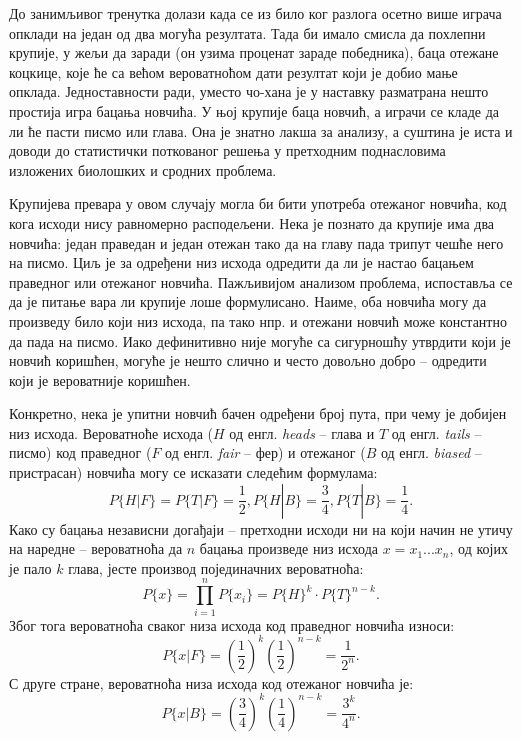 \documentclass[12pt,oneside]{memoir}
\begin{document}
\begin{CJK}{UTF8}{ipxm}
До занимљивог тренутка долази када се из било ког разлога осетно више играча опклади на један од два могућа резултата. Тада би имало смисла да похлепни крупије, у жељи да заради (он узима проценат зараде победника), баца отежане коцкице, које ће са већом вероватноћом дати резултат који је добио мање опклада. Једноставности ради, уместо чо-хана је у наставку разматрана нешто простија игра бацања новчића. У њој крупије баца новчић, а играчи се кладе да ли ће пасти писмо или глава. Она је знатно лакша за анализу, а суштина је иста и доводи до статистички поткованог решења у претходним поднасловима изложених биолошких и сродних проблема.

Крупијева превара у овом случају могла би бити употреба отежаног новчића, код кога исходи нису равномерно расподељени. Нека је познато да крупије има два новчића: један праведан и један отежан тако да на главу пада трипут чешће него на писмо. Циљ је за одређени низ исхода одредити да ли је настао бацањем праведног или отежаног новчића. Пажљивијом анализом проблема, испоставља се да је питање вара ли крупије лоше формулисано. Наиме, оба новчића могу да произведу било који низ исхода, па тако нпр. и отежани новчић може константно да пада на писмо. Иако дефинитивно није могуће са сигурношћу утврдити који је новчић коришћен, могуће је нешто слично и често довољно добро -- одредити који је вероватније коришћен.

Конкретно, нека је упитни новчић бачен одређени број пута, при чему је добијен низ исхода. Вероватноће исхода ($H$ од енгл. \textit{heads} -- глава и $T$ од енгл. \textit{tails} -- писмо) код праведног ($F$ од енгл. \textit{fair} -- фер) и отежаног ($B$ од енгл. \textit{biased} -- пристрасан) новчића могу се исказати следећим формулама: $$P\{H | F\} = P\{T | F\} = \frac{1}{2}, P\{H | B\} = \frac{3}{4}, P\{T | B\} = \frac{1}{4}.$$ Како су бацања независни догађаји -- претходни исходи ни на који начин не утичу на наредне -- вероватноћа да $n$ бацања произведе низ исхода $x = x_1...x_n$, од којих је пало $k$ глава, јесте производ појединачних вероватноћа: $$P\{x\} = \prod_{i=1}^n P\{x_i\} = P\{H\}^k \cdot P\{T\}^{n-k}.$$ Због тога вероватноћа сваког низа исхода код праведног новчића износи: $$P\{x | F\} = \left(\frac{1}{2}\right)^k \left(\frac{1}{2}\right)^{n-k} = \frac{1}{2^n}.$$ С друге стране, вероватноћа низа исхода код отежаног новчића је: $$P\{x | B\} = \left(\frac{3}{4}\right)^k \left(\frac{1}{4}\right)^{n-k} = \frac{3^k}{4^n}.$$


\end{CJK}
\end{document}
